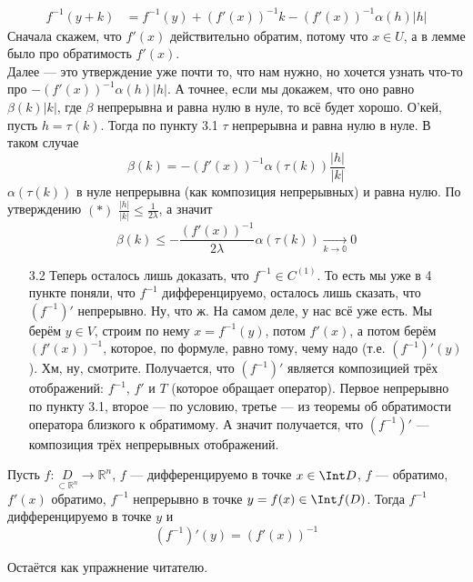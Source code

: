 \documentclass{article}
\begin{document}
\begin{itemize}
\begin{Proof}
\begin{enumerate}
\[\begin{split}
                    f^{-1}(y+k)&=f^{-1}(y)+(f'(x))^{-1}k-(f'(x))^{-1}\alpha(h)|h|
                \end{split}\]
                Сначала скажем, что $f'(x)$ действительно обратим, потому что $x\in U$, а в лемме было про обратимость $f'(x)$.\\
                Далее --- это утверждение уже почти то, что нам нужно, но хочется узнать что-то про $-(f'(x))^{-1}\alpha(h)|h|$. А точнее, если мы докажем, что оно равно $\beta(k)|k|$, где $\beta$ непрерывна и равна нулю в нуле, то всё будет хорошо. О'кей, пусть $h=\tau(k)$. Тогда по пункту 3.1 $\tau$ непрерывна и равна нулю в нуле. В таком случае
                $$
                \beta(k)=-(f'(x))^{-1}\alpha(\tau(k))\frac{|h|}{|k|}
                $$
                $\alpha(\tau(k))$ в нуле непрерывна (как композиция непрерывных) и равна нулю. По утверждению $(*)$ $\frac{|h|}{|k|}\leqslant\frac1{2\lambda}$, а значит
                $$
                \beta(k)\leqslant-\frac{(f'(x))^{-1}}{2\lambda}\alpha(\tau(k))\underset{k\to\mathbb0}\longrightarrow0
                $$
                \begin{enumerate}
                    \item[3.2] Теперь осталось лишь доказать, что $f^{-1}\in C^{(1)}$. То есть мы уже в 4 пункте поняли, что $f^{-1}$ дифференцируемо, осталось лишь сказать, что $(f^{-1})'$ непрерывно. Ну, что ж. На самом деле, у нас всё уже есть. Мы берём $y\in V$, строим по нему $x=f^{-1}(y)$, потом $f'(x)$, а потом берём $(f'(x))^{-1}$, которое, по формуле, равно тому, чему надо (т.е. $(f^{-1})'(y)$). Хм, ну, смотрите. Получается, что $(f^{-1})'$ является композицией трёх отображений: $f^{-1}$, $f'$ и $T$ (которое обращает оператор). Первое непрерывно по пункту 3.1, второе --- по условию, третье --- из теоремы об обратимости оператора близкого к обратимому. А значит получается, что $(f^{-1})'$ --- композиция трёх непрерывных отображений.
                \end{enumerate}
            \end{enumerate}
        \end{Proof}
        \thm Пусть $f\colon\underset{\subset\mathbb R^n}D\to\mathbb R^n$, $f$ --- дифференцируемо в точке $x\in\Int D$, $f$ --- обратимо, $f'(x)$ обратимо, $f^{-1}$ непрерывно в точке $y=f(x)\in\Int f(D)$. Тогда $f^{-1}$ дифференцируемо в точке $y$ и
        $$
        (f^{-1})'(y)=(f'(x))^{-1}
        $$
        \begin{Proof}
            Остаётся как упражнение читателю.
        \end{Proof}

\end{itemize}
\end{document}

